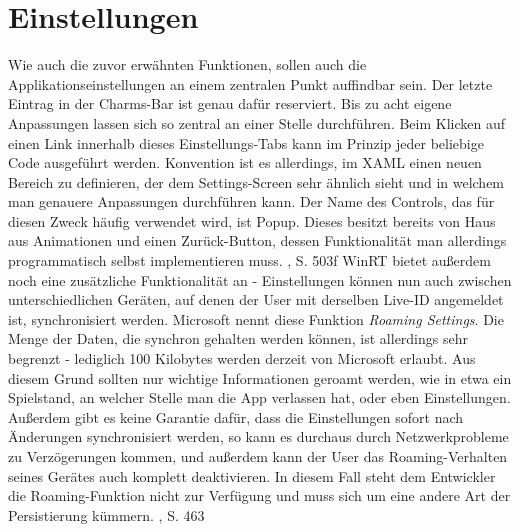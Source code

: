 \documentclass[a4paper,bibtotoc,oneside]{scrbook}
\begin{document}
\section[Einstellungen]{Einstellungen}\label{einstellungen}
Wie auch die zuvor erwähnten Funktionen, sollen auch die Applikationseinstellungen an einem zentralen Punkt auffindbar sein. Der letzte Eintrag in der Charms-Bar ist genau dafür reserviert. Bis zu acht eigene Anpassungen lassen sich so zentral an einer Stelle durchführen.
\newline
\newline
Beim Klicken auf einen Link innerhalb dieses Einstellungs-Tabs kann im Prinzip jeder beliebige Code ausgeführt werden. Konvention ist es allerdings, im XAML einen neuen Bereich zu definieren, der dem Settings-Screen sehr ähnlich sieht und in welchem man genauere Anpassungen durchführen kann. Der Name des Controls, das für diesen Zweck häufig verwendet wird, ist Popup. Dieses besitzt bereits von Haus aus Animationen und einen Zurück-Button, dessen Funktionalität man allerdings programmatisch selbst implementieren muss. \cite{ana12}, S. 503f
\newline
\newline
WinRT bietet außerdem noch eine zusätzliche Funktionalität an - Einstellungen können nun auch zwischen unterschiedlichen Geräten, auf denen der User mit derselben Live-ID angemeldet ist, synchronisiert werden. Microsoft nennt diese Funktion \textit{Roaming Settings}. Die Menge der Daten, die synchron gehalten werden können, ist allerdings sehr begrenzt - lediglich 100 Kilobytes werden derzeit von Microsoft erlaubt. Aus diesem Grund sollten nur wichtige Informationen geroamt werden, wie in etwa ein Spielstand, an welcher Stelle man die App verlassen hat, oder eben Einstellungen.
\newline
Außerdem gibt es keine Garantie dafür, dass die Einstellungen sofort nach Änderungen synchronisiert werden, so kann es durchaus durch Netzwerkprobleme zu Verzögerungen kommen, und außerdem kann der User das Roaming-Verhalten seines Gerätes auch komplett deaktivieren. In diesem Fall steht dem Entwickler die Roaming-Funktion nicht zur Verfügung und muss sich um eine andere Art der Persistierung kümmern.
\cite{ana12}, S. 463
\end{document}
